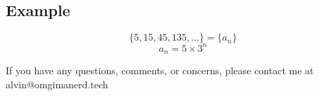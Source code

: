 \documentclass[letterpaper, 12pt]{math}
\begin{document}
\subsection*{Example}
\[ \{5,15,45,135,\dots\} = \{a_{n}\} \]
\[ a_{n} = 5\times 3^{n} \]

\begin{center}
  If you have any questions, comments, or concerns, please contact me at
  alvin@omgimanerd.tech
\end{center}
\end{document}

